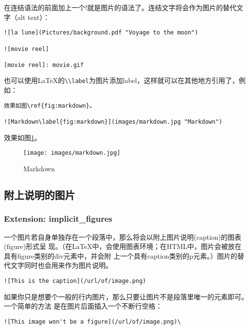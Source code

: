 \documentclass[cn]{elegantbook}
\newcommand{\passthrough}[1]{#1}
\begin{document}
在连结语法的前面加上一个!就是图片的语法了。连结文字将会作为图片的替代文字（alt
text）：

\begin{lstlisting}
![la lune](Pictures/background.pdf "Voyage to the moon")

![movie reel]

[movie reel]: movie.gif
\end{lstlisting}

也可以使用LaTeX的\passthrough{\lstinline!\\label!}为图片添加label，这样就可以在其他地方引用了，例如：

\begin{lstlisting}
效果如图\ref{fig:markdown}。

![Markdown\label{fig:markdown}](images/markdown.jpg "Markdown")
\end{lstlisting}

效果如图\ref{fig:markdown}。

\begin{figure}
\centering
\texttt{[image: images/markdown.jpg]}
\caption{Markdown\label{fig:markdown}}
\end{figure}

\hypertarget{ux9644ux4e0aux8bf4ux660eux7684ux56feux7247}{%
\subsection{附上说明的图片}\label{ux9644ux4e0aux8bf4ux660eux7684ux56feux7247}}

\hypertarget{extension-implicit_figures}{%
\subsubsection{Extension:
implicit\_figures}\label{extension-implicit_figures}}

一个图片若自身单独存在一个段落中，那么将会以附上图片说明(caption)的图表(figure)形式呈
现。（在LaTeX中，会使用图表环境；在HTML中，图片会被放在具有figure类别的div元素中，并会附
上一个具有caption类别的p元素。）图片的替代文字同时也会用来作为图片说明。

\begin{lstlisting}
![This is the caption](/url/of/image.png)
\end{lstlisting}

如果你只是想要个一般的行内图片，那么只要让图片不是段落里唯一的元素即可。一个简单的方法
是在图片后面插入一个不断行空格：

\begin{lstlisting}
![This image won't be a figure](/url/of/image.png)\
\end{lstlisting}
\end{document}
